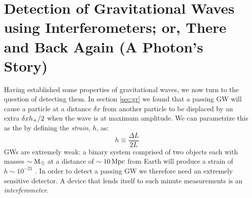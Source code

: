 \section{Detection of Gravitational Waves using Interferometers; or, There and Back Again (A Photon's Story)}
\label{sec:interferometry}

Having established some properties of gravitational waves, we now turn to the question of detecting them. In section \ref{sec:gr} we found that a passing \ac{GW} will cause a particle at a distance $\delta x$ from another particle to be displaced by an extra $\delta xh_{+}/2$ when the wave is at maximum amplitude. We can parametrize this as the by defining the \emph{strain}, $h$, as:
\begin{equation}
h \equiv \frac{\Delta L}{2L}
\end{equation}
\acp{GW} are extremely weak: a binary system comprised of two objects each with masses $\sim \mathrm{M_\odot}$ at a distance of $\sim10\,\mathrm{Mpc}$ from Earth will produce a strain of $h \sim 10^{-21}$ \cite{ref:Saulson}. In order to detect a passing \ac{GW} we therefore need an extremely sensitive detector. A device that lends itself to such minute measurements is an \emph{interferometer}.

